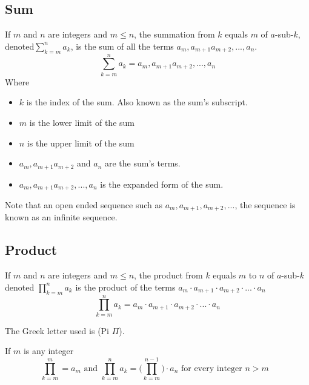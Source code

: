 \documentclass[11pt]{article}
\begin{document}
\subsection{Sum}

\begin{definition}[Sum]\label{def:sum}
    If $m$ and $n$ are integers and $m \leq n$, the summation
    from $k$ equals $m$ of $a$-sub-$k$, denoted$\sum_{k=m}^n a_k$,
    is the sum of all the terms $a_m, a_{m+1} a_{m+2}, ..., a_n$.
    \begin{equation*}
        \sum_{k=m}^n a_k = a_m, a_{m+1} a_{m+2}, ..., a_n
    \end{equation*}
    Where
    \begin{itemize}
        \item $k$ is the index of the sum. Also known as the sum's subscript.
        \item $m$ is the lower limit of the sum
        \item $n$ is the upper limit of the sum
        \item $a_m, a_{m+1} a_{m+2}$ and $a_n$ are the sum's terms.
        \item $a_m, a_{m+1} a_{m+2}, ..., a_n$ is the expanded form of the sum.
    \end{itemize}

    Note that an open ended sequence such as $a_m, a_{m+1}, a_{m+2}, ...$,
    the sequence is known as an infinite sequence.
\end{definition}

\subsection{Product}

\begin{definition}[Product]\label{def:product}
    If $m$ and $n$ are integers and $m \leq n$,
    the product from $k$ equals $m$ to $n$ of $a$-sub-$k$ denoted
    $\prod_{k=m}^n a_k$
    is the product of the terms $a_m \cdot a_{m+1} \cdot a_{m+2} \cdot ... \cdot a_n$
    \begin{equation*}
        \prod_{k=m}^n a_k = a_m \cdot a_{m+1} \cdot a_{m+2} \cdot ... \cdot a_n
    \end{equation*}

    The Greek letter used is (Pi $\Pi$).
\end{definition}

\begin{definition}\label{def:recursive-product}
    If $m$ is any integer
    \begin{equation*}
        \prod_{k=m}^m = a_m \text{ and } \prod_{k=m}^n a_k = \Biggl( \prod_{k=m}^{n-1} \Biggl) \cdot a_n \text { for every integer $n > m$ }
    \end{equation*}
\end{definition}
\end{document}
